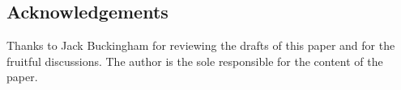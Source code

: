 \documentclass[]{scrartcl}
\theoremstyle{definition}
\begin{document}
\begin{small}
    \section*{Acknowledgements}

    Thanks to Jack Buckingham for reviewing the drafts of this paper and for the fruitful discussions. The author is the sole responsible for the content of the paper.
        
\end{small}








\end{document}
